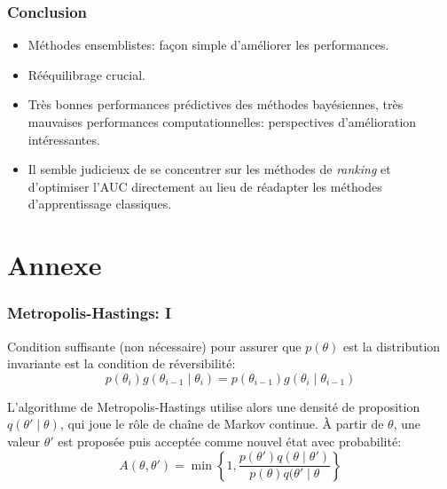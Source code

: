 \documentclass[dvipsnames,10pt]{beamer}
\theoremstyle{plain}
\theoremstyle{definition}
\begin{document}

\begin{frame}
\frametitle{Conclusion}
\begin{itemize}
    \item Méthodes ensemblistes: façon simple d'améliorer les performances.
    \item Rééquilibrage crucial.
    \item Très bonnes performances prédictives des méthodes bayésiennes, très mauvaises performances computationnelles: perspectives d'amélioration intéressantes.
    \item Il semble judicieux de se concentrer sur les méthodes de \emph{ranking} et d'optimiser l'AUC directement au lieu de réadapter les méthodes d'apprentissage classiques.
\end{itemize}
\end{frame}


\section*{Annexe}

\begin{frame}
\frametitle{Metropolis-Hastings: I}
Condition suffisante (non nécessaire) pour assurer que $p(\theta)$ est la distribution invariante est la condition de réversibilité:
\begin{equation}\label{equ:detailed.balance}
    p( \theta_i ) g ( \theta_{i-1} \mid \theta_i ) = p( \theta_{i-1} ) g ( \theta_{i} \mid \theta_{i-1} )
\end{equation}

L'algorithme de Metropolis-Hastings utilise alors une densité de proposition $q (\theta' \mid \theta)$, qui joue le rôle de chaîne de Markov continue. À partir de $\theta$, une valeur $\theta'$ est proposée puis acceptée comme nouvel état avec probabilité:
\begin{equation*}
    A(\theta,\theta') = \min \left\{ 1 , \frac{p(\theta') q(\theta \mid \theta')}{p(\theta) q(\theta'\mid \theta} \right\}
\end{equation*}
\end{frame}
\end{document}
